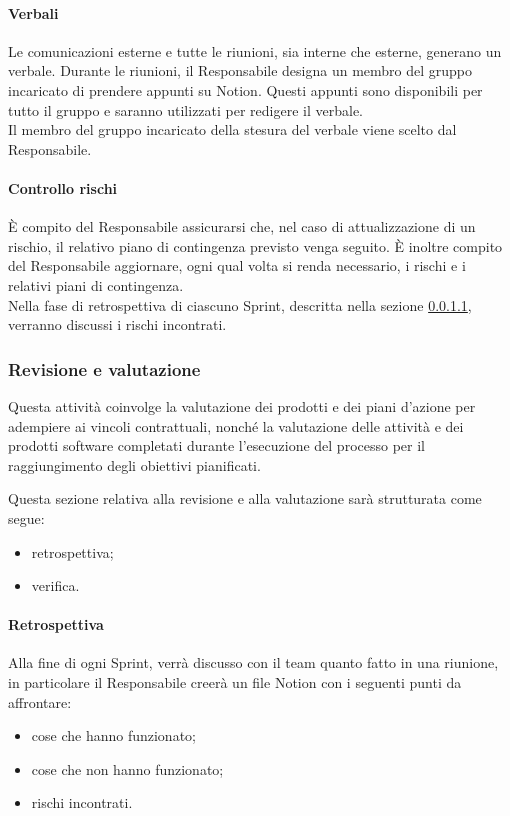     \paragraph{Verbali} \label{sec:exe-verbali}
    Le comunicazioni esterne e tutte le riunioni, sia interne che esterne, generano un verbale. Durante le riunioni, il Responsabile designa un membro del gruppo incaricato di prendere appunti su Notion. Questi appunti sono disponibili per tutto il gruppo e saranno utilizzati per redigere il verbale. \\
    Il membro del gruppo incaricato della stesura del verbale viene scelto dal Responsabile.



    \paragraph{Controllo rischi}
    È compito del Responsabile assicurarsi che, nel caso di attualizzazione di un rischio, il relativo piano di contingenza previsto venga seguito.
    È inoltre compito del Responsabile aggiornare, ogni qual volta si renda necessario, i rischi e i relativi piani di contingenza.\\
    Nella fase di retrospettiva di ciascuno Sprint, descritta nella sezione \ref{sec:val-retrospettiva}, verranno discussi i rischi incontrati.

    \subsubsection{Revisione e valutazione}\label{sec:review}
    Questa attività coinvolge la valutazione dei prodotti e dei piani d'azione per adempiere ai vincoli contrattuali, nonché la valutazione delle attività e dei prodotti software completati durante l'esecuzione del processo per il raggiungimento degli obiettivi pianificati.

    \noindent
    Questa sezione relativa alla revisione e alla valutazione sarà strutturata come segue:
    \begin{itemize}
        \item retrospettiva;
        \item verifica.
    \end{itemize}

    \paragraph{Retrospettiva} \label{sec:val-retrospettiva}
        Alla fine di ogni Sprint, verrà discusso con il team quanto fatto in una riunione, in particolare il Responsabile creerà un file Notion con i seguenti punti da affrontare:
        \begin{itemize}
            \item cose che hanno funzionato;
            \item cose che non hanno funzionato;
            \item rischi incontrati.
        \end{itemize}

